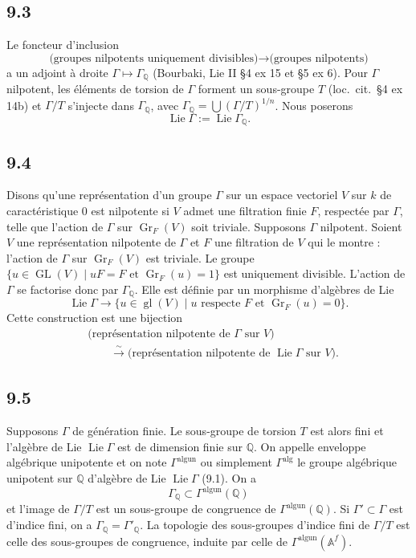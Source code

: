 \documentclass[12pt,a4paper]{article}
\theoremstyle{plain}
\theoremstyle{definition}
\theoremstyle{remark}
\DeclareMathOperator{\Lie}{Lie}
\DeclareMathOperator{\Gr}{Gr}
\DeclareMathOperator{\GL}{GL}
\DeclareMathOperator{\gl}{gl}
\newcommand{\Q}{\mathbb{Q}}
\newcommand{\Af}{\mathbb{A}^f}
\newcommand{\alg}{\mathrm{alg}}
\newcommand{\un}{\mathrm{un}}
\begin{document}
\subsection*{9.3}

Le foncteur d'inclusion
$$\text{(groupes nilpotents uniquement divisibles)} \longrightarrow \text{(groupes nilpotents)}$$
a un adjoint \`a droite $\Gamma \mapsto \Gamma_\Q$ (Bourbaki, Lie II \S 4 ex 15 et \S 5 ex 6). Pour $\Gamma$ nilpotent, les \'el\'ements de torsion de $\Gamma$ forment un sous-groupe $T$ (loc.~cit.~\S 4 ex 14b) et $\Gamma/T$ s'injecte dans $\Gamma_\Q$, avec $\Gamma_\Q = \bigcup (\Gamma/T)^{1/n}$. Nous poserons
$$\Lie \Gamma := \Lie \Gamma_\Q.$$

\subsection*{9.4}

Disons qu'une repr\'esentation d'un groupe $\Gamma$ sur un espace vectoriel $V$ sur $k$ de caract\'eristique 0 est nilpotente si $V$ admet une filtration finie $F$, respect\'ee par $\Gamma$, telle que l'action de $\Gamma$ sur $\Gr_F(V)$ soit triviale. Supposons $\Gamma$ nilpotent. Soient $V$ une repr\'esentation nilpotente de $\Gamma$ et $F$ une filtration de $V$ qui le montre : l'action de $\Gamma$ sur $\Gr_F(V)$ est triviale. Le groupe $\{u \in \GL(V) \mid uF = F \text{ et } \Gr_F(u) = 1\}$ est uniquement divisible. L'action de $\Gamma$ se factorise donc par $\Gamma_\Q$. Elle est d\'efinie par un morphisme d'alg\`ebres de Lie
$$\Lie \Gamma \longrightarrow \{u \in \gl(V) \mid u \text{ respecte } F \text{ et } \Gr_F(u) = 0\}.$$
Cette construction est une bijection
\begin{align*}
&\text{(repr\'esentation nilpotente de $\Gamma$ sur $V$)} \\
&\qquad \xrightarrow{\sim} \text{(repr\'esentation nilpotente de $\Lie \Gamma$ sur $V$)}.
\end{align*}

\subsection*{9.5}

Supposons $\Gamma$ de g\'en\'eration finie. Le sous-groupe de torsion $T$ est alors fini et l'alg\`ebre de Lie $\Lie \Gamma$ est de dimension finie sur $\Q$. On appelle enveloppe alg\'ebrique unipotente et on note $\Gamma^{\alg \un}$ ou simplement $\Gamma^{\alg}$ le groupe alg\'ebrique unipotent sur $\Q$ d'alg\`ebre de Lie $\Lie \Gamma$ (9.1). On a
\begin{equation}\label{9.5.1}
\Gamma_\Q \subset \Gamma^{\alg \un}(\Q) \tag{9.5.1}
\end{equation}
et l'image de $\Gamma/T$ est un sous-groupe de congruence de $\Gamma^{\alg \un}(\Q)$. Si $\Gamma' \subset \Gamma$ est d'indice fini, on a $\Gamma_\Q = \Gamma'_\Q$. La topologie des sous-groupes d'indice fini de $\Gamma/T$ est celle des sous-groupes de congruence, induite par celle de $\Gamma^{\alg \un}(\Af)$.
\end{document}
